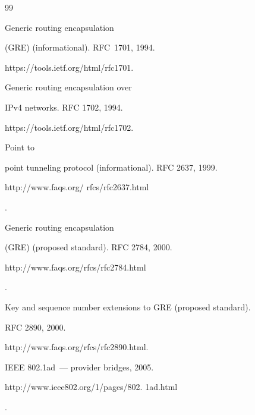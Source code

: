 {\small\frenchspacing


{%




\begin{thebibliography}{99}






  Generic routing encapsulation 


(GRE) (informational). RFC~1701, 1994. 


{\sf https://tools.ietf.org/html/rfc1701}.









Generic routing encapsulation over 


IPv4 networks. RFC 1702, 1994. 


{\sf https://tools.ietf.org/html/rfc1702}.






 Point to 


point tunneling protocol (informational). RFC 2637,   1999. {\sf 


http://www.faqs.org/ rfcs/rfc2637.html}.






  Generic routing encapsulation 


(GRE) (proposed standard).  RFC 2784, 2000.  {\sf  


http://www.faqs.org/rfcs/rfc2784.html}. 




 Key and sequence number extensions to GRE (proposed standard). 


RFC 2890, 2000. 


{\sf http://www.faqs.org/rfcs/rfc2890.html}. 




IEEE 802.1ad~--- provider bridges, 2005.  {\sf 


http://www.ieee802.org/1/pages/802. 1ad.html}.





\end{thebibliography}}}
